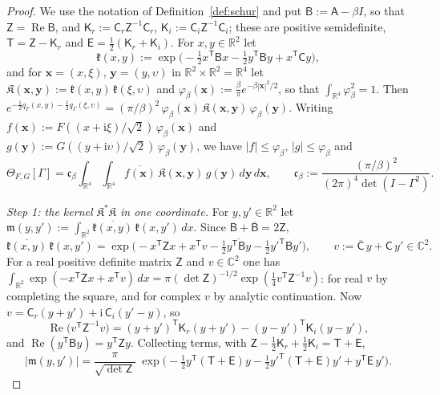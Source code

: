 \documentclass[11pt,reqno]{amsart}
\theoremstyle{definition}
\numberwithin{equation}{section}
\newcommand{\C}{\mathbb{C}}
\newcommand{\R}{\mathbb{R}}
\newcommand{\ii}{\mathrm{i}}
\newcommand{\sA}{\mathsf{A}}
\newcommand{\sB}{\mathsf{B}}
\newcommand{\sC}{\mathsf{C}}
\newcommand{\sZ}{\mathsf{Z}}
\newcommand{\sT}{\mathsf{T}}
\newcommand{\sE}{\mathsf{E}}
\newcommand{\sK}{\mathsf{K}}
\DeclareMathOperator{\RePart}{Re}
\begin{document}
\begin{proof}
We use the notation of Definition~\ref{def:schur} and put $\sB:=\sA-\beta I$, so that $\sZ=\RePart\sB$, and $\sK_r:=\sC_r\sZ^{-1}\sC_r$, $\sK_i:=\sC_i\sZ^{-1}\sC_i$; these are positive semidefinite, $\sT=\sZ-\sK_r$ and $\sE=\frac12(\sK_r+\sK_i)$. For $x,y\in\R^2$ let
\[
  \mathfrak{k}(x,y):=\exp\bigl(-\tfrac12x^{\mathsf{T}}\sB x-\tfrac12y^{\mathsf{T}}\sB y+x^{\mathsf{T}}\sC y\bigr),
\]
and for $\mathbf{x}=(x,\xi)$, $\mathbf{y}=(y,\upsilon)$ in $\R^2\times\R^2=\R^4$ let $\mathfrak{K}(\mathbf{x},\mathbf{y}):=\mathfrak{k}(x,y)\,\mathfrak{k}(\xi,\upsilon)$ and $\varphi_\beta(\mathbf{x}):=\frac\beta\pi e^{-\beta|\mathbf{x}|^2/2}$, so that $\int_{\R^4}\varphi_\beta^2=1$. Then $e^{-\frac12q_\Gamma(x,y)-\frac12q_\Gamma(\xi,\upsilon)}=(\pi/\beta)^2\,\varphi_\beta(\mathbf{x})\,\mathfrak{K}(\mathbf{x},\mathbf{y})\,\varphi_\beta(\mathbf{y})$. Writing $f(\mathbf{x}):=F((x+\ii\xi)/\sqrt2)\,\varphi_\beta(\mathbf{x})$ and $g(\mathbf{y}):=G((y+\ii\upsilon)/\sqrt2)\,\varphi_\beta(\mathbf{y})$, we have $|f|\le\varphi_\beta$, $|g|\le\varphi_\beta$ and
\begin{equation}\label{eq:theta-L}
  \Theta_{F,G}[\Gamma]=\mathfrak{c}_\beta\int_{\R^4}\!\int_{\R^4}\overline{f(\mathbf{x})}\,\mathfrak{K}(\mathbf{x},\mathbf{y})\,g(\mathbf{y})\,d\mathbf{y}\,d\mathbf{x},\qquad \mathfrak{c}_\beta:=\frac{(\pi/\beta)^2}{(2\pi)^4\det(I-\Gamma^2)} .
\end{equation}

\emph{Step 1: the kernel $\mathfrak{K}^*\mathfrak{K}$ in one coordinate.} For $y,y'\in\R^2$ let $\mathfrak{m}(y,y'):=\int_{\R^2}\overline{\mathfrak{k}(x,y)}\,\mathfrak{k}(x,y')\,dx$. Since $\sB+\overline{\sB}=2\sZ$,
\[
  \overline{\mathfrak{k}(x,y)}\,\mathfrak{k}(x,y')=\exp\bigl(-x^{\mathsf{T}}\sZ x+x^{\mathsf{T}}v-\tfrac12\overline{y^{\mathsf{T}}\sB y}-\tfrac12y'^{\mathsf{T}}\sB y'\bigr),\qquad v:=\overline{\sC}\,y+\sC\,y'\in\C^2 .
\]
For a real positive definite matrix $\sZ$ and $v\in\C^2$ one has $\int_{\R^2}\exp(-x^{\mathsf{T}}\sZ x+x^{\mathsf{T}}v)\,dx=\pi(\det\sZ)^{-1/2}\exp(\frac14v^{\mathsf{T}}\sZ^{-1}v)$: for real $v$ by completing the square, and for complex $v$ by analytic continuation. Now $v=\sC_r(y+y')+\ii\,\sC_i(y'-y)$, so
\[
  \RePart\bigl(v^{\mathsf{T}}\sZ^{-1}v\bigr)=(y+y')^{\mathsf{T}}\sK_r(y+y')-(y-y')^{\mathsf{T}}\sK_i(y-y'),
\]
and $\RePart(y^{\mathsf{T}}\sB y)=y^{\mathsf{T}}\sZ y$. Collecting terms, with $\sZ-\frac12\sK_r+\frac12\sK_i=\sT+\sE$,
\begin{equation}\label{eq:m-abs}
  |\mathfrak{m}(y,y')|=\frac{\pi}{\sqrt{\det\sZ}}\;\exp\bigl(-\tfrac12y^{\mathsf{T}}(\sT+\sE)y-\tfrac12y'^{\mathsf{T}}(\sT+\sE)y'+y^{\mathsf{T}}\sE\,y'\bigr).
\end{equation}


\end{proof}
\end{document}
